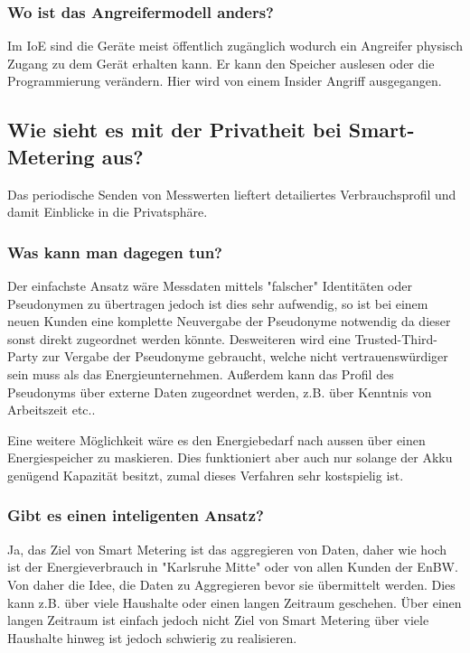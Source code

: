	\subsubsection{Wo ist das Angreifermodell anders?}
	Im IoE sind die Geräte meist öffentlich zugänglich wodurch ein Angreifer physisch Zugang zu dem Gerät erhalten kann. Er kann den Speicher auslesen oder die Programmierung verändern.
	Hier wird von einem Insider Angriff ausgegangen.
	
	\subsection{Wie sieht es mit der Privatheit bei Smart-Metering aus?}
	Das periodische Senden von Messwerten lieftert detailiertes Verbrauchsprofil und damit Einblicke in die Privatsphäre.
	
	\subsubsection{Was kann man dagegen tun?}
	Der einfachste Ansatz wäre Messdaten mittels "falscher" Identitäten oder Pseudonymen zu übertragen jedoch ist dies sehr aufwendig, so ist bei einem neuen Kunden eine komplette Neuvergabe der Pseudonyme notwendig da dieser sonst direkt zugeordnet werden könnte. Desweiteren wird eine Trusted-Third-Party zur Vergabe der Pseudonyme gebraucht, welche nicht vertrauenswürdiger sein muss als das Energieunternehmen.
	Außerdem kann das Profil des Pseudonyms über externe Daten zugeordnet werden, z.B. über Kenntnis von Arbeitszeit etc..
	
	Eine weitere Möglichkeit wäre es den Energiebedarf nach aussen über einen Energiespeicher zu maskieren. Dies funktioniert aber auch nur solange der Akku genügend Kapazität besitzt, zumal dieses Verfahren sehr kostspielig ist.

\subsubsection{Gibt es einen inteligenten Ansatz?}
	Ja, das Ziel von Smart\- Metering ist das aggregieren von Daten, daher wie hoch ist der Energieverbrauch in "Karlsruhe\- Mitte" oder von allen Kunden der EnBW. Von daher die Idee, die Daten zu Aggregieren bevor sie übermittelt werden. Dies kann z.B. über viele Haushalte oder einen langen Zeitraum geschehen. 
	Über einen langen Zeitraum ist einfach jedoch nicht Ziel von Smart\- Metering über viele Haushalte hinweg ist jedoch schwierig zu realisieren.
